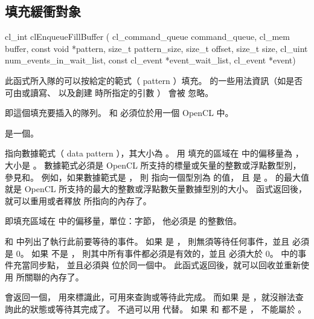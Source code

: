 \subsection{填充緩衝對象}


\startCLFUNC
cl_int clEnqueueFillBuffer (
			cl_command_queue command_queue,
			cl_mem buffer,
			const void *pattern,
			size_t pattern_size,
			size_t offset,
			size_t size,
			cl_uint num_events_in_wait_list,
			const cl_event *event_wait_list,
			cl_event *event)
\stopCLFUNC

此函式所入隊的可以按給定的範式（ pattern ）填充。
 的一些用法資訊（如是否可由或讀寫、
以及創建  時所指定的引數 ）
會被  忽略。

 即這個填充要插入的隊列。
 和  必須位於用一個 OpenCL 中。

 是一個。

 指向數據範式（ data pattern ），其大小為 。
用  填充的區域在  中的偏移量為 ，
大小是 。
數據範式必須是 OpenCL 所支持的標量或矢量的整數或浮點數型別，
參見和。
例如，如果數據範式是 ，
則  指向一個型別為  的值，
且  是 。
 的最大值就是
OpenCL 所支持的最大的整數或浮點數矢量數據型別的大小。
函式返回後，就可以重用或者釋放  所指向的內存了。

 即填充區域在  中的偏移量，單位：字節，
他必須是  的整數倍。

 和 
中列出了執行此前要等待的事件。
如果  是 ，
則無須等待任何事件，並且  必須是 0。
如果  不是 ，
則其中所有事件都必須是有效的，並且  必須大於 0。
 中的事件充當同步點，
並且必須與  位於同一個中。
此函式返回後，就可以回收並重新使用  所關聯的內存了。

 會返回一個，
用來標識此，可用來查詢或等待此完成。
而如果  是 ，就沒辦法查詢此的狀態或等待其完成了。
不過可以用  代替。
如果  和  都不是 ，
 不能屬於 。


